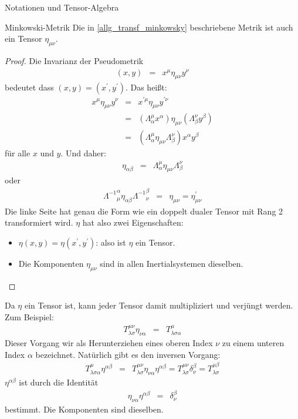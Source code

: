 \begin{chapter}{\titlestr}
\begin{section}{Notationen und Tensor-Algebra}
\begin{subsection}{Minkowski-Metrik}
Die in \ref{allg_transf_minkowsky} beschriebene Metrik ist auch ein Tensor $\eta_{\mu\nu}$.
\begin{proof}
Die Invarianz der Pseudometrik
\begin{eqnarray*}
(x,y) &=& x^\mu \eta_{\mu\nu} y^\nu
\end{eqnarray*}
bedeutet dass $(x,y)=(x^\prime,y^\prime)$. Das heißt:
\begin{eqnarray*}
x^\mu \eta_{\mu\nu} y^\nu &=& x^{\prime\mu} \eta_{\mu\nu} y^{\prime\nu}\\
&=& \left(\Lambda^\mu_\alpha x^{\alpha}\right) \eta_{\mu\nu} \left(\Lambda^\nu_\beta y^{\beta}\right)\\
&=& \left(\Lambda^\mu_\alpha \eta_{\mu\nu}\Lambda^\nu_\beta\right)x^{\alpha}y^{\beta}
\end{eqnarray*}
für alle $x$ und $y$. Und daher:
\begin{eqnarray*}
\eta_{\alpha\beta} &=& \Lambda^\mu_\alpha \eta_{\mu\nu}\Lambda^\nu_\beta
\end{eqnarray*}
oder
\begin{eqnarray*}
{\Lambda^{-1}}^\alpha_\mu\eta_{\alpha\beta}{\Lambda^{-1}}^\beta_\nu &=& \eta_{\mu\nu}=\eta^\prime_{\mu\nu}
\end{eqnarray*}
Die linke Seite hat genau die Form wie ein doppelt dualer Tensor mit Rang 2 transformiert wird.
$\eta$ hat also zwei Eigenschaften:
\begin{itemize}
	\item $\eta(x,y)=\eta(x^\prime,y^\prime)$: also ist $\eta$ ein Tensor.
	\item Die Komponenten $\eta_{\mu\nu}$ sind in allen Inertialsystemen dieselben.
\end{itemize}
\end{proof}
Da $\eta$ ein Tensor ist, kann jeder Tensor damit multipliziert und verjüngt werden. Zum Beispiel:
\begin{eqnarray*}
T^{\mu\nu}_{\lambda\sigma}\eta_{\nu\alpha} &=& T^\mu_{\lambda\sigma\alpha}
\end{eqnarray*}
Dieser Vorgang wir als Herunterziehen eines oberen Index $\nu$ zu einem unteren Index $\alpha$ bezeichnet.
Natürlich gibt es den inversen Vorgang:
\begin{eqnarray*}
T^\mu_{\lambda\sigma\alpha}\eta^{\alpha\beta} &=& T^{\mu\nu}_{\lambda\sigma}\eta_{\nu\alpha}\eta^{\alpha\beta}
=T^{\mu\nu}_{\lambda\sigma}\delta^\beta_\nu=T^{\mu\beta}_{\lambda\sigma}
\end{eqnarray*}
$\eta^{\alpha\beta}$ ist durch die Identität
\begin{eqnarray*}
\eta_{\nu\alpha}\eta^{\alpha\beta}&=&\delta^\beta_\nu
\end{eqnarray*}
bestimmt. Die Komponenten sind dieselben.


\end{subsection}
\end{section}
\end{chapter}
